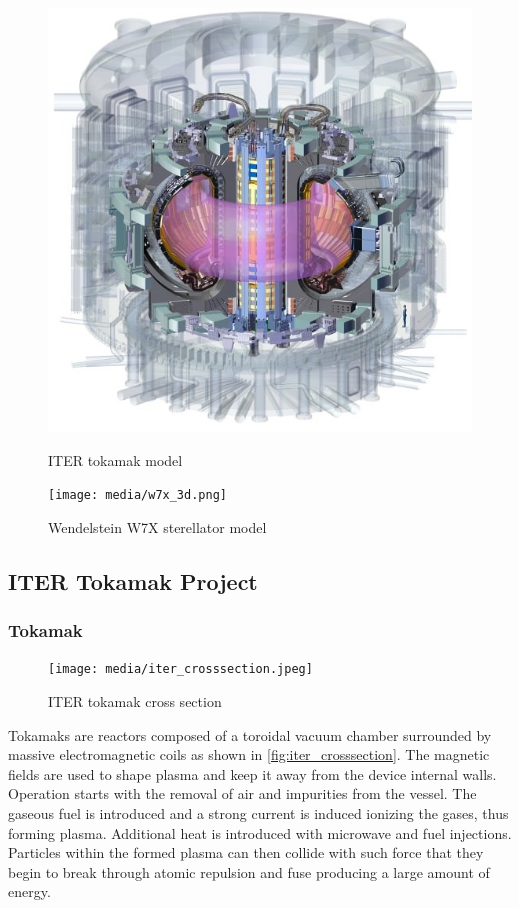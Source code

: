   \begin{figure}
  \centering
  \begin{minipage}{.5\textwidth}
	\centering
	\includegraphics[width=.5\linewidth]{media/iter_reactor_3d.jpeg}
	\caption{ITER tokamak model\cite{iter_website}}
	\label{fig:iter_reactor}
  \end{minipage}%
  \begin{minipage}{.5\textwidth}
	\centering
	\texttt{[image: media/w7x\_3d.png]}
	\caption{Wendelstein W7X sterellator model\cite{w7x_website}}
	\label{fig:w7x_reactor}
  \end{minipage}
  \end{figure}

\subsection{ITER Tokamak Project}
  \subsubsection{Tokamak}
	\begin{figure}
	  \centering
	  \texttt{[image: media/iter\_crosssection.jpeg]}
	  \caption{ITER tokamak cross section\cite{iter_website}}
	  \label{fig:iter_crosssection}
	\end{figure}
	Tokamaks are reactors composed of a toroidal vacuum chamber surrounded by
	massive electromagnetic coils as shown in \autoref{fig:iter_crosssection}.
	The magnetic fields are used to shape plasma 
	and keep it away from the device internal walls. 
	Operation starts with the removal of air and impurities from the vessel.
	The gaseous fuel is introduced and a strong current is induced 
	ionizing the gases, thus forming plasma. Additional heat is introduced with
	microwave and fuel injections. Particles within the
	formed plasma can then collide with such force that they begin
	to break through atomic repulsion and fuse producing a large amount of energy.
	\cite{iter_website}
